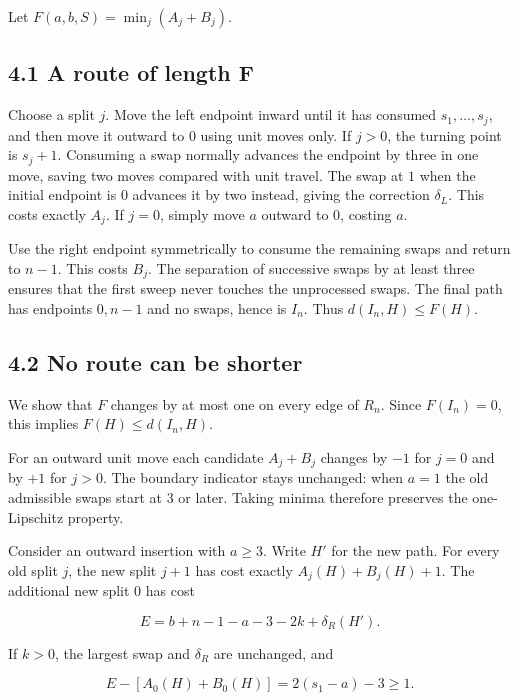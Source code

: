 \documentclass[11pt,a4paper]{article}
\begin{document}
Let \(F(a,b,S)=\min_j(A_j+B_j)\).

\hypertarget{a-route-of-length-f}{%
\subsection{4.1 A route of length F}\label{a-route-of-length-f}}

Choose a split \(j\). Move the left endpoint inward until it has consumed \(s_1,\ldots,s_j\), and then move it outward to \(0\) using unit moves only. If \(j>0\), the turning point is \(s_j+1\). Consuming a swap normally advances the endpoint by three in one move, saving two moves compared with unit travel. The swap at \(1\) when the initial endpoint is \(0\) advances it by two instead, giving the correction \(\delta_L\). This costs exactly \(A_j\). If \(j=0\), simply move \(a\) outward to \(0\), costing \(a\).

Use the right endpoint symmetrically to consume the remaining swaps and return to \(n-1\). This costs \(B_j\). The separation of successive swaps by at least three ensures that the first sweep never touches the unprocessed swaps. The final path has endpoints \(0,n-1\) and no swaps, hence is \(I_n\). Thus \(d(I_n,H)\le F(H)\).

\hypertarget{no-route-can-be-shorter}{%
\subsection{4.2 No route can be shorter}\label{no-route-can-be-shorter}}

We show that \(F\) changes by at most one on every edge of \(R_n\). Since \(F(I_n)=0\), this implies \(F(H)\le d(I_n,H)\).

For an outward unit move each candidate \(A_j+B_j\) changes by \(-1\) for \(j=0\) and by \(+1\) for \(j>0\). The boundary indicator stays unchanged: when \(a=1\) the old admissible swaps start at \(3\) or later. Taking minima therefore preserves the one-Lipschitz property.

Consider an outward insertion with \(a\ge3\). Write \(H'\) for the new path. For every old split \(j\), the new split \(j+1\) has cost exactly \(A_j(H)+B_j(H)+1\). The additional new split \(0\) has cost

\[ E=b+n-1-a-3-2k+\delta_R(H'). \]

If \(k>0\), the largest swap and \(\delta_R\) are unchanged, and

\[ E-[A_0(H)+B_0(H)]=2(s_1-a)-3\ge1. \]
\end{document}
